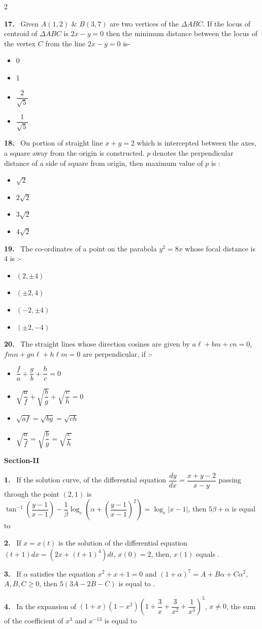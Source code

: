 \documentclass[10pt]{extarticle}
\newcommand{\sect}[1]{\par\smallskip\noindent\textbf{#1}\par}
\newcommand{\qn}[1]{\par\smallskip\noindent\textbf{#1.}~}
\newenvironment{qoptions}{\begin{itemize}[leftmargin=1.8em,itemsep=1pt,topsep=2pt,label={}]}{\end{itemize}}
\newcommand{\opt}[2]{\item[(#1)] #2}
\begin{document}
\begin{multicols}{2}
\qn{17} Given $A(1,2)$ \& $B(3,7)$ are two vertices of the $\Delta ABC$. If the locus of centroid of $\Delta ABC$ is $2x-y=0$ then the minimum distance between the locus of the vertex $C$ from the line $2x-y=0$ is-
\begin{qoptions}
\opt{A}{0}
\opt{B}{1}
\opt{C}{$\dfrac2{\sqrt5}$}
\opt{D}{$\dfrac1{\sqrt5}$}
\end{qoptions}

\qn{18} On portion of straight line $x+y=2$ which is intercepted between the axes, a square away from the origin is constructed. $p$ denotes the perpendicular distance of a side of square from origin, then maximum value of $p$ is :
\begin{qoptions}
\opt{A}{$\sqrt2$}
\opt{B}{$2\sqrt2$}
\opt{C}{$3\sqrt2$}
\opt{D}{$4\sqrt2$}
\end{qoptions}

\qn{19} The co-ordinates of a point on the parabola $y^2=8x$ whose focal distance is 4 is :-
\begin{qoptions}
\opt{A}{$(2,\pm4)$}
\opt{B}{$(\pm2,4)$}
\opt{C}{$(-2,\pm4)$}
\opt{D}{$(\pm2,-4)$}
\end{qoptions}

\qn{20} The straight lines whose direction cosines are given by $a\ell+bm+cn=0$, $fmn+gn\ell+h\ell m=0$ are perpendicular, if :-
\begin{qoptions}
\opt{A}{$\dfrac fa+\dfrac gb+\dfrac hc=0$}
\opt{B}{$\sqrt{\dfrac af}+\sqrt{\dfrac bg}+\sqrt{\dfrac ch}=0$}
\opt{C}{$\sqrt{af}=\sqrt{bg}=\sqrt{ch}$}
\opt{D}{$\sqrt{\dfrac af}=\sqrt{\dfrac bg}=\sqrt{\dfrac ch}$}
\end{qoptions}

\sect{Section-II}

\qn{1} If the solution curve, of the differential equation $\dfrac{dy}{dx}=\dfrac{x+y-2}{x-y}$ passing through the point $(2,1)$ is $\tan^{-1}\left(\dfrac{y-1}{x-1}\right)-\dfrac1\beta\log_e\left(\alpha+\left(\dfrac{y-1}{x-1}\right)^2\right)=\log_e|x-1|$, then $5\beta+\alpha$ is equal to

\qn{2} If $x=x(t)$ is the solution of the differential equation $(t+1)dx=\left(2x+(t+1)^4\right)dt$, $x(0)=2$, then, $x(1)$ equals \underline{\hspace{4em}}.

\qn{3} If $\alpha$ satisfies the equation $x^2+x+1=0$ and $(1+\alpha)^7=A+B\alpha+C\alpha^2$, $A,B,C\ge0$, then $5(3A-2B-C)$ is equal to \underline{\hspace{3em}}.

\qn{4} In the expansion of $(1+x)(1-x^2)\left(1+\dfrac3x+\dfrac3{x^2}+\dfrac1{x^3}\right)^5$, $x\ne0$, the sum of the coefficient of $x^3$ and $x^{-13}$ is equal to \underline{\hspace{3em}}


\end{multicols}
\end{document}

